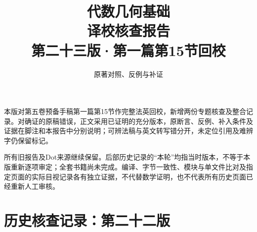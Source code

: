 
\newcommand{\RR}{\mathcal R}
\newcommand{\FF}{\mathcal F}
\newcommand{\GG}{\mathcal G}
\newcommand{\MM}{\mathcal M}
\newcommand{\JJ}{\mathcal J}
\newcommand{\oldauditsrc}[1]{\par\noindent\textbf{原文位置：}#1。\par}
\newcommand{\kind}[2]{\noindent\textbf{分类：#1。}\ #2\par}
\newcommand{\lead}[1]{\par\noindent\textbf{#1}\quad}
\newenvironment{analysisproof}{\par\noindent\textbf{该轮核查的反例或补证。}\ }{\par}

\title{代数几何基础\\译校核查报告\\[1em]\large 第二十三版·第一篇第15节回校}
\author{原著对照、反例与补证}
\date{}

\frontmatter
\maketitle
{}
本版对第五卷预备手稿第一篇第15节作完整法英回校，新增两份专题核查及整合记录。对确证的原稿错误，正文采用已证明的充分版本，原断言、反例、补入条件及证据在脚注和本报告中分别说明；可辨法稿与英文转写错分开，未定位引用及难辨字仍保留标记。

所有旧报告及Dot来源继续保留。后部历史记录的“本轮”均指当时版本，不等于本版重新逐项审定；全套书籍尚未完成。编译、字节一致性、模块与单文件比对及指定页面的实际目视记录各有独立证据，不代替数学证明，也不代表所有历史页面已经重新人工审核。

\tableofcontents
\mainmatter



\setcounter{secnumdepth}{-2}
\part{历史核查记录：第二十二版}
\setcounter{secnumdepth}{2}




\setcounter{secnumdepth}{-2}
